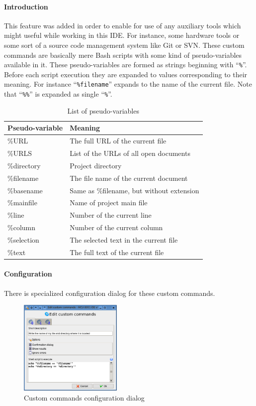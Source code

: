 \documentclass[a4paper,twoside,12pt]{book}
\newcommand{\mysmallfont}{\fontsize{8pt}{10pt} \selectfont{}}
\begin{document}
			\paragraph{Introduction}
				This feature was added in order to enable for use of any auxiliary tools which might useful while working in this IDE. For instance, some hardware tools or some sort of a source code management system like Git or SVN. These custom commands are basically mere Bash scripts with some kind of pseudo-variables available in it. These pseudo-variables are formed as strings beginning with ``\texttt{\%}''. Before each script execution they are expanded to values corresponding to their meaning. For instance ``\texttt{\%filename}'' expands to the name of the current file. Note that ``\texttt{\%\%}'' is expanded as single ``\texttt{\%}''.\\
				\begin{table}[htp]
					\centering{}
					\mysmallfont{}
					\begin{tabular}{|l|l|}
						\hline
						\textbf{Pseudo-variable} & \textbf{Meaning}			\\
						\hline
						\%URL		& The full URL of the current file		\\
						\%URLS		& List of the URLs of all open documents	\\
						\%directory	& Project directory				\\
						\%filename	& The file name of the current document		\\
						\%basename	& Same as \%filename, but without extension	\\
						\%mainfile	& Name of project main file			\\
						\%line		& Number of the current line			\\
						\%column	& Number of the current column			\\
						\%selection	& The selected text in the current file		\\
						\%text		& The full text of the current file		\\
						\hline
					\end{tabular}
					\caption{List of pseudo-variables}
				\end{table}

			\paragraph{Configuration}
				There is specialized configuration dialog for these custom commands.
				\begin{figure}
					\centering{}
					\includegraphics[width=140pt]{img/010.png}
					\caption{Custom commands configuration dialog}
				\end{figure}
\end{document}
